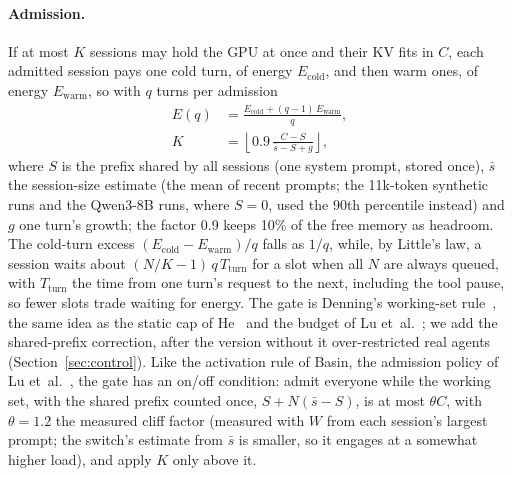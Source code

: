 \paragraph{Admission.} If at most $K$ sessions may hold the GPU at once and their KV fits in $C$, each admitted session pays one
cold turn, of energy $E_{\text{cold}}$, and then warm ones, of energy $E_{\text{warm}}$, so with $q$ turns per admission
\begin{equation}
  \begin{aligned}
  E(q) &= \frac{E_{\text{cold}} + (q-1)\,E_{\text{warm}}}{q},\\
  K &= \left\lfloor 0.9\,\frac{C - S}{\bar s - S + g}\right\rfloor,
  \end{aligned}
  \label{eq:gate}
\end{equation}
where $S$ is the prefix shared by all sessions (one system prompt, stored once), $\bar s$ the session-size estimate (the mean of recent prompts; the 11k-token
synthetic runs and the Qwen3-8B runs, where $S=0$, used the 90th percentile instead) and
$g$ one turn's growth; the factor 0.9 keeps 10\% of the free memory as headroom. The cold-turn excess
$(E_{\text{cold}}-E_{\text{warm}})/q$ falls as $1/q$, while, by Little's law, a session waits about
$(N/K-1)\,q\,T_{\text{turn}}$ for a slot when all $N$ are always queued, with $T_{\text{turn}}$ the time from one turn's request to the next, including the tool pause, so fewer slots trade waiting for energy. The gate is Denning's working-set rule~\cite{denning1968working},
the same idea as the static cap of He~\cite{he2026robot} and the budget of Lu et~al.~\cite{lu2026metastability}; we add the
shared-prefix correction, after the version without it over-restricted real agents (Section~\ref{sec:control}). Like
the activation rule of Basin, the admission policy of Lu et~al.~\cite{lu2026metastability}, the gate has an on/off condition: admit everyone while the working set, with the shared prefix counted once, $S + N(\bar s - S)$, is at most $\theta C$, with $\theta=1.2$ the measured cliff factor (measured with $W$ from each session's largest prompt; the switch's estimate from $\bar s$ is smaller, so it engages at a somewhat higher load),
and apply $K$ only above it.
